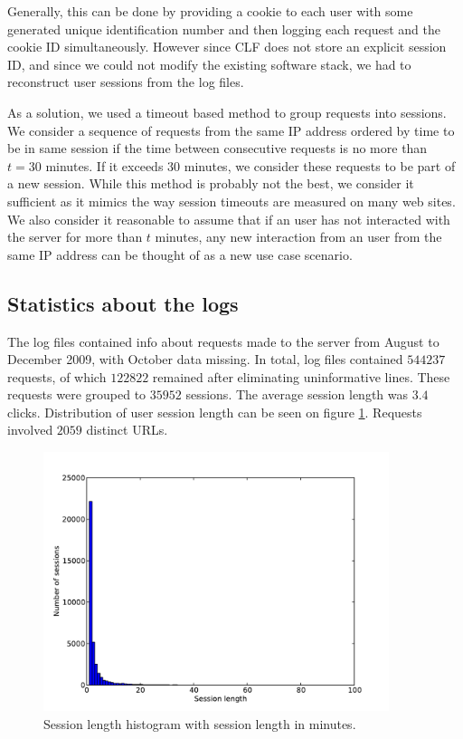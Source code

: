 \documentclass[12pt, english,a4paper]{article}
\begin{document}
Generally, this can be done by providing a cookie to each user with some generated unique identification number and then logging each request and the cookie ID simultaneously. However since CLF does not store an explicit session ID, and since we could not modify the existing software stack, we had to reconstruct user sessions from the log files.  

As a solution, we used a timeout based method to group requests into sessions. We consider a sequence of requests from the same IP address ordered by time to be in same session if the time between consecutive requests is no more than $t = 30$ minutes. If it exceeds $30$ minutes, we consider these requests to be part of a new session. While this method is probably not the best, we consider it sufficient as it mimics the way session timeouts are measured on many web sites. We also consider it reasonable to assume that if an user has not interacted with the server for more than $t$
minutes, any new interaction from an user from the same IP address can be thought of as a new use case scenario.







\subsection{Statistics about the logs} 
The log files contained info about requests made to the server from August to December 2009, with October data missing. In total, log files contained $544237$ requests, of which $122822$ remained after eliminating uninformative lines. These requests were grouped to $35952$ sessions. The average session length was $3.4$ clicks. Distribution of user session length can be seen on figure \ref{session_len}. Requests involved $2059$ distinct URLs.

\begin{figure}[H]
  \centering
      \includegraphics[width=0.9\textwidth]{session_len}
  \caption{Session length histogram with session length in minutes.}
  \label{session_len}
\end{figure}
\end{document}
